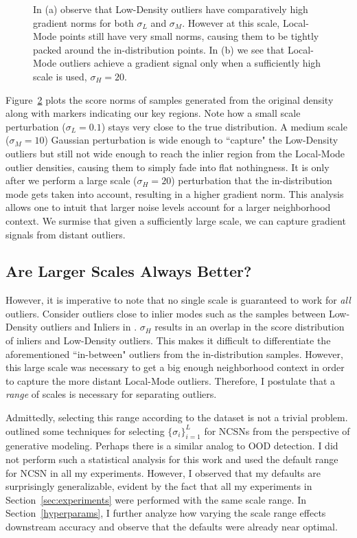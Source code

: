 \begin{figure}[tbhp]
\begin{subfigure}[b]{0.45\textwidth}
    \label{fig:score_norms_3d}
\end{subfigure}
\caption{In (a) observe that Low-Density outliers have comparatively high gradient norms for both $\sigma_{L}$ and $\sigma_{M}$. However at this scale, Local-Mode points still have very small norms, causing them to be tightly packed around the in-distribution points. In (b) we see that Local-Mode outliers achieve a gradient signal only when a sufficiently high scale is used, $\sigma_{H}=20$.}
\label{fig:norm_plots}
\end{figure}

Figure~\ref{fig:norm_plots} plots the score norms of samples generated from the original density along with markers indicating our key regions. Note how a small scale perturbation ($\sigma_{L}=0.1$) stays very close to the true distribution. A medium scale ($\sigma_{M}=10$) Gaussian perturbation is wide enough to ``capture" the Low-Density outliers but still not wide enough to reach the inlier region from the Local-Mode outlier densities, causing them to simply fade into flat nothingness. It is only after we perform a large scale ($\sigma_{H}=20$) perturbation that the in-distribution mode gets taken into account, resulting in a higher gradient norm. This analysis allows one to intuit that larger noise levels account for a larger neighborhood context. We surmise that given a sufficiently large scale, we can capture gradient signals from distant outliers.

\subsection*{Are Larger Scales Always Better?}

However, it is imperative to note that no single scale is guaranteed to work for \textit{all} outliers. Consider outliers close to inlier modes such as the samples between Low-Density outliers and Inliers in . $\sigma_H$ results in an overlap in the score distribution of inliers and Low-Density outliers. This makes it difficult to differentiate the aforementioned ``in-between" outliers from the in-distribution samples. However, this large scale was necessary to get a big enough neighborhood context in order to capture the more distant Local-Mode outliers. Therefore, I postulate that a \emph{range} of scales is necessary for separating outliers.

Admittedly, selecting this range according to the dataset is not a trivial problem. \cite{song2020improved} outlined some techniques for selecting $\{\sigma_i\}_{i=1}^L$ for NCSNs from the perspective of generative modeling. Perhaps there is a similar analog to OOD detection. I did not perform such a statistical analysis for this work and used the default range for NCSN in all my experiments. However, I observed that my defaults are surprisingly generalizable, evident by the fact that all my experiments in Section~\ref{sec:experiments} were performed with the same scale range. In Section~\ref{hyperparams}, I further analyze how varying the scale range effects downstream accuracy and observe that the defaults were already near optimal.


